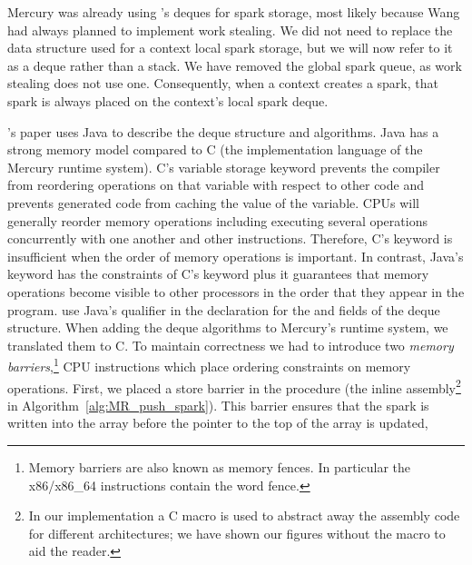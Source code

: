 Mercury was already using \citet{Chase_2005_wsdeque}'s deques for spark
storage,
most likely because Wang had always planned to implement work stealing.
We did not need to replace the data structure used for a context local
spark storage,
but we will now refer to it as a deque rather than a stack.
We have removed the global spark queue,
as work stealing does not use one.
Consequently,
when a context creates a spark,
that spark is always placed on the context's local spark deque.

\citet{Chase_2005_wsdeque}'s paper uses Java to describe the deque structure
and algorithms.
Java has a strong memory model compared to C (the implementation language of
the Mercury runtime system).
C's  variable storage keyword prevents the compiler from
reordering operations on that variable with respect to other code and
prevents generated code from caching the value of the variable.
CPUs will generally reorder memory operations including executing
several operations concurrently with one another and other instructions.
Therefore, C's  keyword is insufficient when the order of
memory operations is important.
In contrast,
Java's  keyword has the constraints of C's keyword
plus it guarantees that memory operations become visible to other
processors in the order that they appear in the program.
\citet{Chase_2005_wsdeque} use Java's  qualifier in the
declaration for the  and  fields of the deque
structure.
When adding the deque algorithms to Mercury's runtime system,
we translated them to C.
To maintain correctness we had to introduce two \emph{memory barriers},\footnote{
    Memory barriers are also known as memory fences.
    In particular the x86/x86\_64 instructions contain the word fence.}
CPU instructions which place ordering constraints on memory operations.
First, we placed a store barrier in the \push procedure
(the inline assembly\footnote{
    In our implementation a C macro is used to abstract away the assembly
    code for different architectures;
    we have shown our figures without the macro to aid the reader.}
in Algorithm~\ref{alg:MR_push_spark}).
This barrier ensures that the spark is written into the array before the pointer to
the top of the array is updated,
